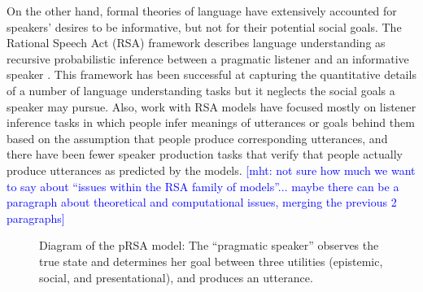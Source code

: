 \documentclass[12pt]{article}
\newcommand{\mht}[1]{\textcolor{Blue}{[mht: #1]}}
\begin{document}
On the other hand, formal theories of language have extensively accounted for speakers' desires to be informative, 
but not for their potential social goals. 
The Rational Speech Act (RSA) framework describes language understanding 
as recursive probabilistic inference between a pragmatic listener and an informative speaker \cite{goodman2016}. 
This framework has been successful at capturing the quantitative details of a number of language understanding tasks 
but it neglects the social goals a speaker may pursue. 
Also, work with RSA models have focused mostly on listener inference tasks 
in which people infer meanings of utterances or goals behind them 
based on the assumption that people produce corresponding utterances, 
and there have been fewer speaker production tasks 
that verify that people actually produce utterances as predicted by the models. 
\mht{not sure how much we want to say about ``issues within the RSA family of models''... maybe there can be a paragraph about theoretical and computational issues, merging the previous 2 paragraphs}

\begin{figure}
\centering
\caption{\label{fig:model}Diagram of the pRSA model: The \enquote{pragmatic speaker} observes the true state and determines her goal between three utilities (epistemic, social, and presentational), and produces an utterance. 
}
\end{figure}

\end{document}
